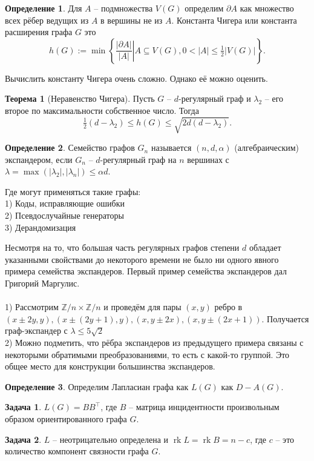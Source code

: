\documentclass[10pt,a4paper,oneside]{book}
\theoremstyle{definition}
\newtheorem{zad}{\color{violet!100!black}Задача}
\newtheorem*{defn}{\color{yellow!30!red} Определение}
\newtheorem*{thmm}{\color{red!40!black} Теорема}
\renewcommand{\leq}{\leqslant}
\newcommand{\mb}[1]{\mathbb{#1}}
\newcommand{\rk}{\operatorname{rk}}
\def\exm{\noindent {\bf Примеры:}}
\def\dfn{\begin{defn}}
\def\edfn{\end{defn}}
\def\zd{\begin{zad}}
\def\ezd{\end{zad}}
\begin{document}
\dfn Для $A$ -- подмножества $V(G)$ определим $\partial A$ как множество всех рёбер ведущих из $A$ в вершины не из $A$. Константа Чигера или константа расширения графа  $G$ это 
$$h(G) := \min \left\{ \left. \frac{| \partial A |}{| A |} \right|   A \subseteq V(G), 0 < | A | \leq \tfrac{1}{2} | V(G)| \right\} .$$
\edfn

Вычислить константу Чигера очень сложно. Однако её можно оценить.

\begin{thmm}[Неравенство Чигера] Пусть $G$ -- $d$-регулярный граф и $\lambda_2$ -- его второе по максимальности собственное число. Тогда
$$\tfrac{1}{2}(d - \lambda_2) \le h(G) \le \sqrt{2d(d - \lambda_2)}.$$
\end{thmm}



\dfn Семейство графов $G_n$ называется $(n,d,\alpha)$ (алгебраическим) экспандером, если $G_n$ -- $d$-регулярный граф на $n$ вершинах с $\lambda=\max(|\lambda_2|,|\lambda_n|)\leq \alpha d$.
\edfn

Где могут применяться такие графы:\\
1) Коды, исправляющие ошибки\\
2) Псевдослучайные генераторы\\
3) Дерандомизация

Несмотря на то, что большая часть регулярных графов степени $d$ обладает указанными свойствами  до некоторого времени не было ни одного явного примера семейства экспандеров. Первый пример семейства экспандеров дал Григорий Маргулис. \\


\exm\\
1) Рассмотрим $\mb Z/n \times \mb Z/n$ и проведём для пары $(x,y)$ ребро в $(x \pm 2y,y), (x \pm (2y+1),y), (x,y \pm 2x), (x,y \pm (2x+1))$. Получается граф-экспандер с $\lambda \leq 5\sqrt{2}$\\
2) Можно подметить, что рёбра экспандеров из предыдущего примера связаны с некоторыми обратимыми преобразованиями, то есть с какой-то группой. Это общее место для конструкции большинства экспандеров.



\dfn Определим Лапласиан графа как $L(G)$ как $D-A(G)$.
\edfn

\zd $L(G)=B B^\top$, где $B$ -- матрица инцидентности произвольным образом ориентированного графа $G$.
\ezd

\zd $L$ -- неотрицательно определена и  $\rk L= \rk B=n-c$, где $c$ -- это количество компонент связности графа $G$.
\ezd
\end{document}
